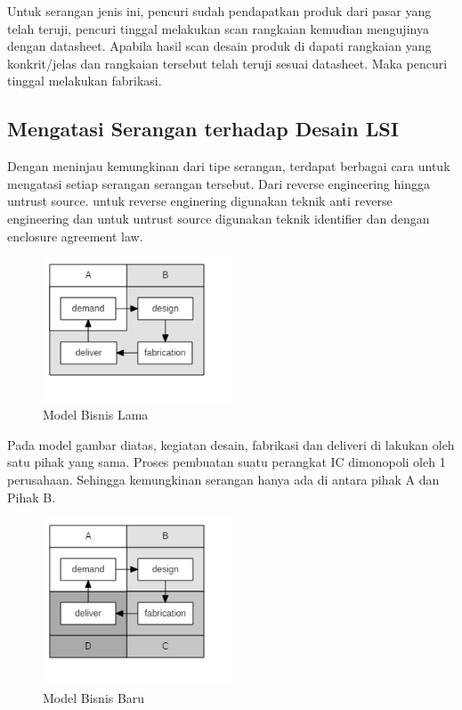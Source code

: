 Untuk serangan jenis ini, pencuri sudah pendapatkan produk dari pasar yang telah teruji, pencuri tinggal melakukan scan rangkaian kemudian mengujinya dengan datasheet. Apabila hasil scan desain produk di dapati rangkaian yang konkrit/jelas dan rangkaian tersebut telah teruji sesuai datasheet. Maka pencuri tinggal melakukan fabrikasi.

% 

\subsection{Mengatasi Serangan terhadap Desain LSI}
Dengan meninjau kemungkinan dari tipe serangan, terdapat berbagai cara untuk mengatasi setiap serangan serangan tersebut. Dari reverse engineering hingga untrust source. untuk reverse enginering digunakan teknik anti reverse engineering dan untuk untrust source digunakan teknik identifier dan dengan enclosure agreement law.

\begin{figure}
	\centering
	\includegraphics[width=0.5\textwidth]
	{diagrams/oldBusinessLSI.png}
	\caption{Model Bisnis Lama}
	\label{fig:oldbiss}
\end{figure}

Pada model gambar diatas, kegiatan desain, fabrikasi dan deliveri di lakukan oleh satu pihak yang sama. Proses pembuatan suatu perangkat IC dimonopoli oleh 1 perusahaan. Sehingga kemungkinan serangan hanya ada di antara pihak A dan Pihak B.

\begin{figure}
	\centering
	\includegraphics[width=0.5\textwidth]
	{diagrams/newBusinessLSI.png}
	\caption{Model Bisnis Baru}
	\label{fig:newbiss}
\end{figure}

